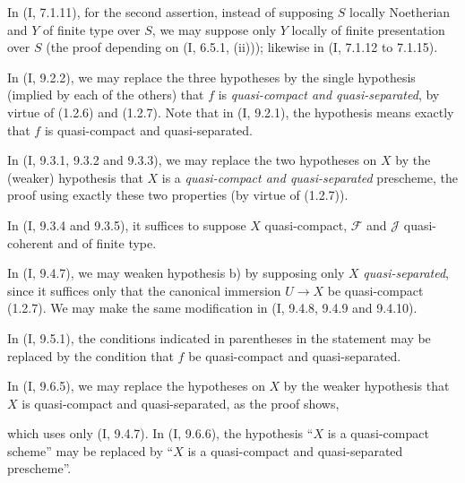 \begin{env}[1.7.3]
\label{IV.1.7.3}
In (I, 7.1.11), for the second assertion, instead of supposing $S$
locally Noetherian and $Y$ of finite type over $S$, we may suppose only
$Y$ locally of finite presentation over $S$ (the proof depending on
(I, 6.5.1, (ii))); likewise in (I, 7.1.12 to 7.1.15).
\end{env}

\begin{env}[1.7.4]\label{IV.1.7.4}
In (I, 9.2.2), we may replace the three hypotheses by the single hypothesis
(implied by each of the others) that $f$ is \emph{quasi-compact and
quasi-separated}, by virtue of (1.2.6) and (1.2.7). Note that in
(I, 9.2.1), the hypothesis means exactly that $f$ is quasi-compact and
quasi-separated.
\end{env}

\begin{env}[1.7.5]
\label{IV.1.7.5}
In (I, 9.3.1, 9.3.2 and 9.3.3), we may replace the two hypotheses on $X$
by the (weaker) hypothesis that $X$ is a \emph{quasi-compact and
quasi-separated} prescheme, the proof using exactly these two properties (by
virtue of (1.2.7)).
\end{env}

\begin{env}[1.7.6]
\label{IV.1.7.6}
In (I, 9.3.4 and 9.3.5), it suffices to suppose $X$ quasi-compact,
$\mathcal F$ and $\mathcal J$ quasi-coherent and of finite type.
\end{env}

\begin{env}[1.7.7]
\label{IV.1.7.7}
In (I, 9.4.7), we may weaken hypothesis b) by supposing only $X$
\emph{quasi-separated}, since it suffices only that the canonical immersion
$U\to X$ be quasi-compact (1.2.7). We may make the same modification in
(I, 9.4.8, 9.4.9 and 9.4.10).
\end{env}

\begin{env}[1.7.8]
\label{IV.1.7.8}
In (I, 9.5.1), the conditions indicated in parentheses in the statement
may be replaced by the condition that $f$ be quasi-compact and
quasi-separated.
\end{env}

\begin{env}[1.7.9]
\label{IV.1.7.9}
In (I, 9.6.5), we may replace the hypotheses on $X$ by the weaker
hypothesis that $X$ is quasi-compact and quasi-separated, as the
proof shows,


which uses only (I, 9.4.7). In (I, 9.6.6), the hypothesis ``$X$ is a
quasi-compact scheme'' may be replaced by ``$X$ is a quasi-compact and
quasi-separated prescheme''.
\end{env}

